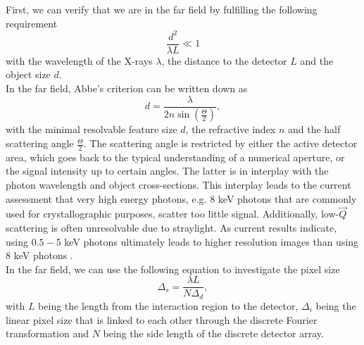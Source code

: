 First, we can verify that we are in the far field by fulfilling the following requirement \cite{Williams-2010-NJP}
\begin{equation}
\frac{d^{2}}{\lambda L} \ll 1
\label{eq:far-field-test}
\end{equation}
with the wavelength of the X-rays $\lambda$, the distance to the detector $L$ and the object size $d$.\\
In the far field, Abbe's criterion can be written down as
\begin{equation}
    d = \frac{\lambda}{2n \sin(\frac{\Theta}{2})},
\end{equation}
with the minimal resolvable feature size $d$, the refractive index $n$ and the half scattering angle $\frac{\Theta}{2}$. The scattering angle is restricted by either the active detector area, which goes back to the typical understanding of a numerical aperture, or the signal intensity up to certain angles. The latter is in interplay with the photon wavelength and object cross-sections. This interplay leads to the current assessment that very high energy photons, e.g. $8$ keV photons that are commonly used for crystallographic purposes, scatter too little signal. Additionally, low-$\vec{Q}$ scattering is often unresolvable due to straylight. As current results indicate, using $0.5-5$ keV photons ultimately leads to higher resolution images than using $8$ keV photons \citep{Aquila-2015-StrucDyn}.\\
In the far field, we can use the following equation to investigate the pixel size \cite{Williams-2010-NJP}
\begin{equation}
    \Delta_{s} = \frac{\lambda L}{N \Delta_{d}},
\label{eq:relation-pixel-fourier}
\end{equation}
with $L$ being the length from the interaction region to the detector, $\Delta_{i}$ being the linear pixel size that is linked to each other through the discrete Fourier transformation and $N$ being the side length of the discrete detector array.\\
